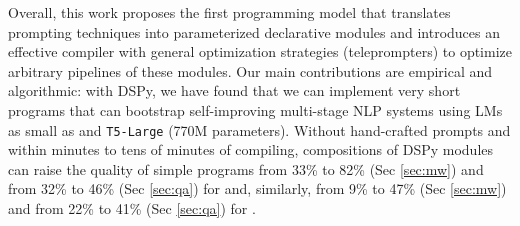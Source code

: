 Overall, this work proposes the first programming model that translates prompting techniques into parameterized declarative modules and introduces an effective compiler with general optimization strategies (teleprompters) to optimize arbitrary pipelines of these modules. Our main contributions are empirical and algorithmic: with DSPy, we have found that we can implement very short programs that can bootstrap self-improving multi-stage NLP systems using LMs as small as \llamaThirteenChat{} and \texttt{T5-Large} (770M parameters). Without hand-crafted prompts and within minutes to tens of minutes of compiling, compositions of DSPy modules can raise the quality of simple programs from 33\% to 82\% (Sec \ref{sec:mw}) and from 32\% to 46\% (Sec \ref{sec:qa}) for \gptThreeFive{} and, similarly, from 9\% to 47\% (Sec \ref{sec:mw}) and from 22\% to 41\% (Sec \ref{sec:qa}) for \llamaThirteenChat{}.











